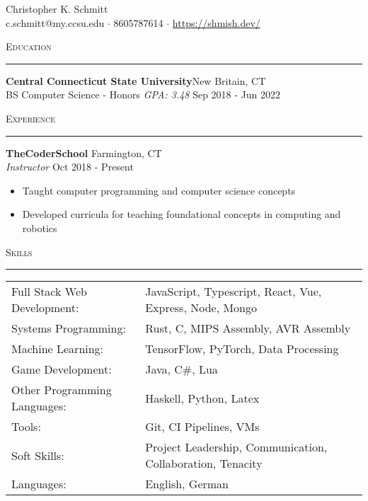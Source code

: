 \documentclass[a4paper]{article}
\newenvironment{cvsection}[1]{
  \noindent\textsc{#1}
  \vspace{4pt}
  \hrule
  \vspace{4pt}

}{\vspace{4pt}}
\newcommand{\school}[5] {
  \noindent\textbf{#1}\hfill #2\\
  \noindent#3 \textit{GPA: #4} \hfill #5\\
}
\newcommand{\employer}[4] {
  \noindent\textbf{#1} \hfill #2\\
  \noindent\textit{#3} \hfill #4\\
  \vspace{-8pt}
}
\begin{document}
  \begin{center}
    {\huge Christopher K. Schmitt}\\
    \vspace{8pt}
    c.schmitt@my.ccsu.edu $\cdot$ 8605787614 $\cdot$ \href{https://shmish.dev/}{https://shmish.dev/}\\
  \end{center}

  \begin{cvsection}{Education}
    \school{Central Connecticut State University}{New Britain, CT}{BS Computer Science - Honors}{3.48}{Sep 2018 - Jun 2022}
  \end{cvsection}

  \begin{cvsection}{Experience}
    \employer{TheCoderSchool}{Farmington, CT}{Instructor}{Oct 2018 - Present}
    
    \begin{itemize}
      \item Taught computer programming and computer science concepts
      \item Developed curricula for teaching foundational concepts in computing and robotics
    \end{itemize}
  \end{cvsection}

  \begin{cvsection}{Skills}
    \begin{tabular}{ l l }
      Full Stack Web Development:  & JavaScript, Typescript, React, Vue, Express, Node, Mongo   \\
      Systems Programming:         & Rust, C, MIPS Assembly, AVR Assembly                       \\
      Machine Learning:            & TensorFlow, PyTorch, Data Processing                       \\
      Game Development:            & Java, C\#, Lua                                             \\
      Other Programming Languages: & Haskell, Python, Latex                                     \\
      Tools:                       & Git, CI Pipelines, VMs                                     \\
      Soft Skills:                 & Project Leadership, Communication, Collaboration, Tenacity \\
      Languages:                   & English, German                                            \\
    \end{tabular}\\
  \end{cvsection}
\end{document}
